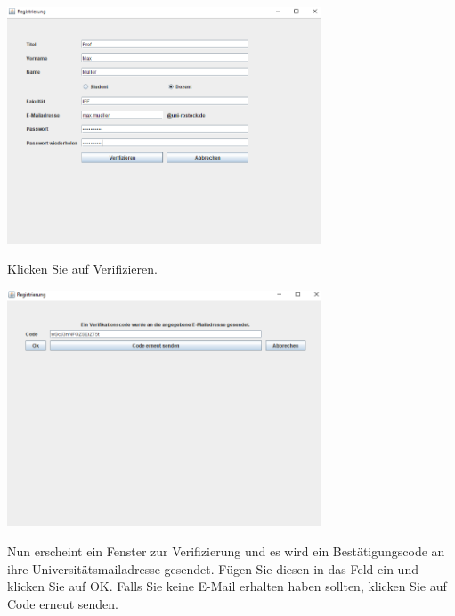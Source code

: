 \documentclass{Handbuch}
\begin{document}
\begin{center}
	\includegraphics[width=0.7\textwidth]{img_DozentenGUI_03.png}
\end{center}
Klicken Sie auf \frqq Verifizieren\flqq. 
\begin{center}
	\includegraphics[width=0.7\textwidth]{img_DozentenGUI_04.png}
\end{center}
Nun erscheint ein Fenster zur Verifizierung und es wird ein Bestätigungscode an ihre Universitätsmailadresse gesendet. Fügen Sie diesen in das Feld ein und klicken Sie auf \frqq OK\flqq.
Falls Sie keine E-Mail erhalten haben sollten, klicken Sie auf \frqq Code erneut senden\flqq. 
\end{document}
